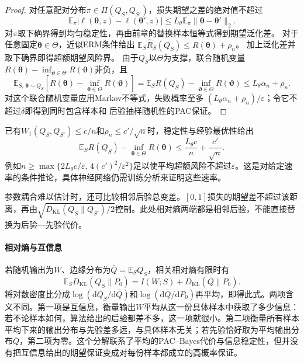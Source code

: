 \begin{proof}
对任意配对分布$\pi\in\Pi(Q_S,Q_{S'})$，损失期望之差的绝对值不超过
\[
 \mathbb E_\pi|\ell(\bm\theta,z)-\ell(\bm\theta',z)|
 \leq L_\theta\mathbb E_\pi\|\bm\theta-\bm\theta'\|_2.
\]
对$\pi$取下确界得到均匀稳定性，再由前章的替换样本恒等式得到期望泛化差。
对于任意固定$\bm\theta\in\Theta$，近似ERM条件给出
$\mathbb E_S\hat R_S(Q_S)\leq R(\bm\theta)+\rho_n$。
加上泛化差并取下确界即得超额期望风险界。
由于$Q_S$以$\Theta$为支撑，联合随机变量
$R(\bm\theta)-\inf_{\bm\vartheta\in\Theta}R(\bm\vartheta)$非负，且
\[
 \mathbb E_{S,\,\bm\theta\sim Q_S}
 \left[R(\bm\theta)-\inf_{\bm\vartheta\in\Theta}R(\bm\vartheta)\right]
 =\mathbb E_S R(Q_S)-\inf_{\bm\vartheta\in\Theta}R(\bm\vartheta)
 \leq L_\theta\alpha_n+\rho_n.
\]
对这个联合随机变量应用Markov不等式，失败概率至多
$(L_\theta\alpha_n+\rho_n)/\varepsilon$；令它不超过$\delta$即得到同时包含样本和
后验抽样随机性的PAC保证。
\end{proof}

已有$W_1(Q_S,Q_{S'})\leq c/n$和$\rho_n\leq c'/\sqrt n$时，稳定性与经验最优性给出
\[
 \mathbb E_S R(Q_S)-\inf_{\bm\theta\in\Theta}R(\bm\theta)
 \leq\frac{L_\theta c}{n}+\frac{c'}{\sqrt n}.
\]
例如$n\geq\max\{2L_\theta c/\varepsilon,\,4(c')^2/\varepsilon^2\}$足以使平均超额风险不超过$\varepsilon$。这是对给定速率的条件推论，具体神经网络仍需训练分析来证明这些速率。

参数耦合难以估计时，还可比较相邻后验总变差。$[0,1]$损失的期望差不超过该距离，再由$\sqrt{D_{\mathrm{KL}}(Q_S\|Q_{S'})/2}$控制。此处相对熵两端都是相邻后验，不能直接替换为后验—先验代价。

\paragraph{相对熵与互信息}

若随机输出为$W$、边缘分布为$\bar Q=\mathbb E_SQ_S$，相关相对熵有限时有
\begin{equation}
 \mathbb E_SD_{\mathrm{KL}}(Q_S\|P_0)
 =I(W;S)+D_{\mathrm{KL}}(\bar Q\|P_0).
 \label{eq:pac-bayes-information-decomposition}
\end{equation}
将对数密度比分成$\log(\mathrm dQ_S/\mathrm d\bar Q)$和$\log(\mathrm d\bar Q/\mathrm dP_0)$再平均，即得此式。两项含义不同。第一项是互信息，衡量输出$W$平均从这一份具体样本中获取了多少信息：若不论样本如何，算法给出的后验都差不多，这一项就很小。第二项衡量所有样本平均下来的输出分布与先验差多远，与具体样本无关；若先验恰好取为平均输出分布$\bar Q$，第二项为零。这个分解联系了平均的PAC--Bayes代价与信息稳定性，但并没有把互信息给出的期望保证变成对每份样本都成立的高概率保证。

